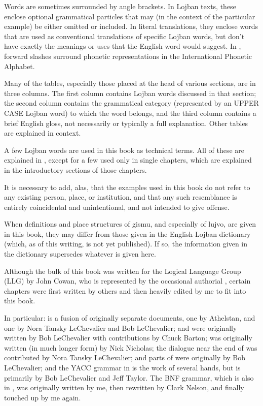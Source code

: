 Words are sometimes surrounded by angle brackets. In Lojban texts, these enclose optional grammatical particles that may (in the context of the particular example) be either omitted or included. In literal translations, they enclose words that are used as conventional translations of specific Lojban words, but don't have exactly the meanings or uses that the English word would suggest. In , forward slashes surround phonetic representations in the International Phonetic
Alphabet.

Many of the tables, especially those placed at the head of various sections, are in three columns. The first column contains Lojban words discussed in that section; the second column contains the grammatical category (represented by an UPPER CASE Lojban word) to which the word belongs, and the third column contains a brief English gloss, not necessarily or typically a full explanation. Other tables are explained in context.

A few Lojban words are used in this book as technical terms. All of these are explained in , except for a few used only in single chapters, which are explained in the introductory sections of those chapters.



It is necessary to add, alas, that the examples used in this book do not refer to any existing person, place, or institution, and that any such resemblance is entirely coincidental and unintentional, and not intended to give offense.

When definitions and place structures of gismu, and especially of lujvo, are given in this book, they may differ from those given in the English-Lojban dictionary (which, as of this writing, is not yet published). If so, the information given in the dictionary supersedes whatever is given here.



Although the bulk of this book was written for the Logical Language Group (LLG) by John Cowan, who is represented by the occasional authorial , certain chapters were first written by others and then heavily edited by me to fit into this book.

In particular:  is a fusion of originally separate documents, one by Athelstan, and one by Nora Tansky LeChevalier and Bob LeChevalier;  and  were originally written by Bob LeChevalier with contributions by Chuck Barton;  was originally written (in much longer form) by Nick Nicholas; the dialogue near the end of  was contributed by Nora Tansky LeChevalier;  and parts of  were originally by Bob LeChevalier; and the YACC grammar in  is the work of several hands, but is primarily by Bob LeChevalier and Jeff Taylor. The BNF grammar, which is also in , was originally written by me, then rewritten by Clark Nelson, and finally touched up by me again.

